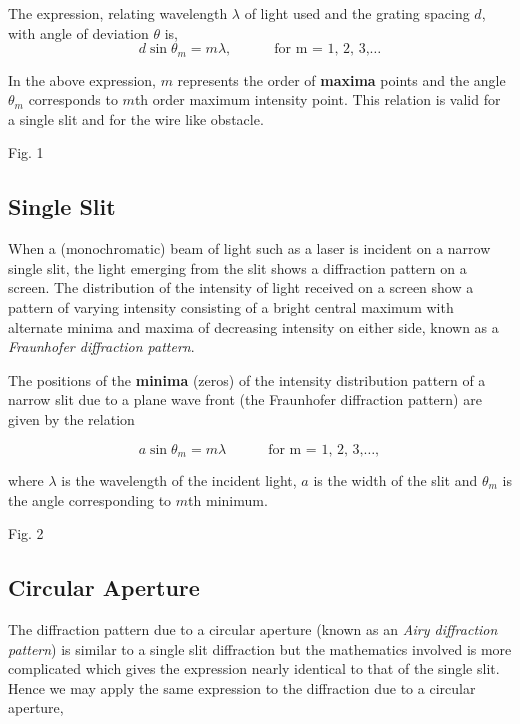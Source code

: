 The expression, relating wavelength $\lambda$ of light used and the grating spacing $d$, with angle of deviation $\theta$ is,    
\begin{equation*}
    d \sin{\theta_m} = m \lambda,  \quad\quad\quad \text{for    m  = 1, 2, 3,}\hdots
\end{equation*}

In the above expression, $m$ represents the order of \textbf{maxima} points and the angle $\theta_m$  corresponds to  $m$th  order maximum intensity point. This relation is valid for a single slit and for the wire like obstacle.

Fig. 1

\subsection*{Single Slit}

When a (monochromatic) beam of light such as a laser is incident on a narrow single slit, the light emerging from the slit shows a diffraction pattern on a screen. The distribution of the intensity of light received on a screen show a pattern of varying intensity consisting of a bright central maximum with alternate minima and maxima of decreasing intensity on either side, known as a \textit{Fraunhofer diffraction pattern}.

The positions of the \textbf{minima} (zeros) of the intensity distribution pattern of a narrow slit due to a plane wave front (the Fraunhofer diffraction pattern) are given by the relation 

\begin{equation*}
    a \sin{\theta_m} = m \lambda  \quad\quad\quad \text{for    m  = 1, 2, 3,}\hdots,
\end{equation*}

where $\lambda$ is the wavelength of the incident light, $a$ is the width of the slit and $\theta_m$ is the angle corresponding to $m$th minimum. 

Fig. 2



\subsection*{Circular Aperture}

The diffraction pattern due to a circular aperture (known as an \textit{Airy diffraction pattern}) is similar to a single slit diffraction but the mathematics involved is more complicated which gives the expression nearly identical to that of the single slit. Hence we may apply the same expression to the diffraction due to a circular aperture, 


